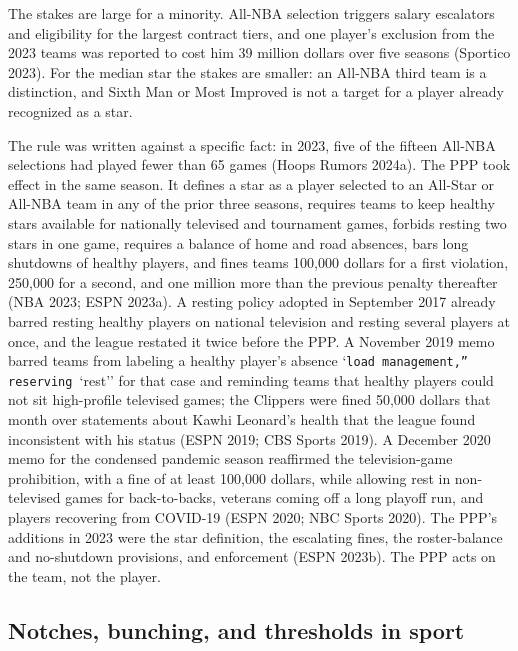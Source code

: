 \documentclass[11pt]{article}
\begin{document}
The stakes are large for a minority. All-NBA selection triggers salary escalators and eligibility for the largest contract tiers, and one player's exclusion from the 2023 teams was reported to cost him 39 million dollars over five seasons (Sportico 2023). For the median star the stakes are smaller: an All-NBA third team is a distinction, and Sixth Man or Most Improved is not a target for a player already recognized as a star.

The rule was written against a specific fact: in 2023, five of the fifteen All-NBA selections had played fewer than 65 games (Hoops Rumors 2024a). The PPP took effect in the same season. It defines a star as a player selected to an All-Star or All-NBA team in any of the prior three seasons, requires teams to keep healthy stars available for nationally televised and tournament games, forbids resting two stars in one game, requires a balance of home and road absences, bars long shutdowns of healthy players, and fines teams 100,000 dollars for a first violation, 250,000 for a second, and one million more than the previous penalty thereafter (NBA 2023; ESPN 2023a). A resting policy adopted in September 2017 already barred resting healthy players on national television and resting several players at once, and the league restated it twice before the PPP. A November 2019 memo barred teams from labeling a healthy player's absence `\texttt{load management,'' reserving }`rest'' for that case and reminding teams that healthy players could not sit high-profile televised games; the Clippers were fined 50,000 dollars that month over statements about Kawhi Leonard's health that the league found inconsistent with his status (ESPN 2019; CBS Sports 2019). A December 2020 memo for the condensed pandemic season reaffirmed the television-game prohibition, with a fine of at least 100,000 dollars, while allowing rest in non-televised games for back-to-backs, veterans coming off a long playoff run, and players recovering from COVID-19 (ESPN 2020; NBC Sports 2020). The PPP's additions in 2023 were the star definition, the escalating fines, the roster-balance and no-shutdown provisions, and enforcement (ESPN 2023b). The PPP acts on the team, not the player.


\subsection*{Notches, bunching, and thresholds in sport}
\end{document}
